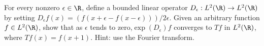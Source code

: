 For every nonzero $\epsilon\in \R$, define a bounded linear operator
$D_{\epsilon}:L^2(\R)\rightarrow L^2(\R)$ by setting
$D_{\epsilon}f(x)=(f(x+\epsilon-f(x-\epsilon)))/2\epsilon$.  Given an
arbitrary function $f\in L^2(\R)$, show that as $\epsilon$ tends to
zero,$\exp(D_{\epsilon})f$ converges to $Tf$ in $L^2(\R)$, where
$Tf(x)=f(x+1)$. Hint: use the Fourier transform.
